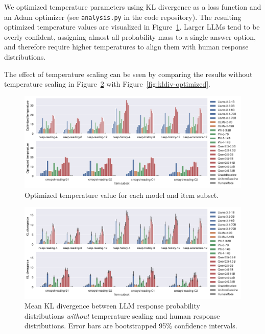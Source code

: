 \documentclass[11pt]{article}
\begin{document}
We optimized temperature parameters using KL divergence as a loss function and an Adam optimizer (see \texttt{analysis.py} in the code repository). The resulting optimized temperature values are visualized in Figure~\ref{fig:temperature}. Larger LLMs tend to be overly confident, assigning almost all probability mass to a single answer option, and therefore require higher temperatures to align them with human response distributions.

The effect of temperature scaling can be seen by comparing the results without temperature scaling in Figure~\ref{fig:kldiv-unoptimized} with Figure~\ref{fig:kldiv-optimized}.

\begin{figure}[h]
  \centering
  \includegraphics[width=\textwidth]{figures/temperature.pdf}
  \caption{Optimized temperature value for each model and item subset.}
  \label{fig:temperature}
\end{figure}

\begin{figure}[h]
  \centering
  \includegraphics[width=\textwidth]{figures/kldiv-unoptimized.pdf}
  \caption{Mean KL divergence between LLM response probability distributions \emph{without} temperature scaling and human response distributions. Error bars are bootstrapped 95\% confidence intervals.}
  \label{fig:kldiv-unoptimized}
\end{figure}
\end{document}
